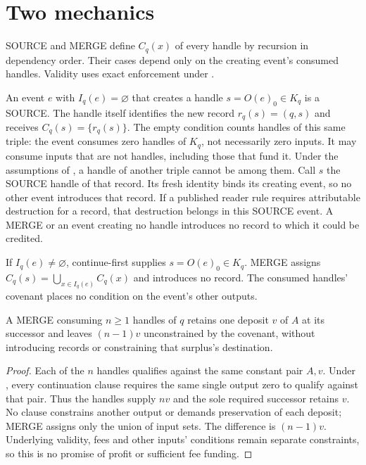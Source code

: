 \documentclass[../main.tex]{subfiles}
\begin{document}
\section{Two mechanics}
\label{sec:kpcfixed:operations}

SOURCE and MERGE define $C_q(x)$ of every handle by recursion in dependency
order. Their cases depend only on the creating event's consumed handles.
Validity uses exact enforcement under .

\begin{operation}[SOURCE]
\label{op:kpcfixed-operations:source}
An event $e$ with $I_q(e)=\varnothing$ that creates a handle
$s=O(e)_0\in K_q$ is a SOURCE. The handle itself identifies the new record
$r_q(s)=(q,s)$ and receives $C_q(s)=\{r_q(s)\}$.
The empty condition counts handles of this same triple: the
event consumes zero handles of $K_q$, not necessarily zero inputs.
It may consume inputs that are not handles, including those that fund it.
Under the assumptions of ,
a handle of another triple cannot be among them.
Call $s$ the SOURCE handle of that record. Its fresh identity binds its
creating event, so no other event introduces that record.
If a published reader rule requires attributable destruction for a
record, that destruction belongs in this SOURCE event. A MERGE or an
event creating no handle introduces no record to which it could be credited.
\end{operation}

\begin{operation}[MERGE]
\label{op:kpcfixed-operations:merge}
If $I_q(e)\ne\varnothing$, continue-first supplies $s=O(e)_0\in K_q$.
MERGE assigns $C_q(s)=\bigcup_{x\in I_q(e)}C_q(x)$ and introduces no record.
The consumed handles' covenant places no condition on the event's other
outputs.
\end{operation}

\begin{proposition}
\label{prop:kpcfixed-operations:merge-surplus}
A MERGE consuming $n\ge 1$ handles of $q$ retains one deposit $v$ of $A$ at
its successor and leaves $(n-1)v$ unconstrained by the covenant, without
introducing records or constraining that surplus's destination.
\end{proposition}
\begin{proof}
Each of the $n$ handles qualifies against the same constant pair $A,v$.
Under , every continuation clause
requires the same single output zero to qualify
against that pair. Thus the handles supply $nv$ and the sole required
successor retains $v$. No clause constrains another output or demands
preservation of each deposit; MERGE assigns only the union of input sets.
The difference is $(n-1)v$. Underlying validity, fees and other inputs'
conditions remain separate constraints, so this is no promise of profit
or sufficient fee funding.
\end{proof}
\end{document}

